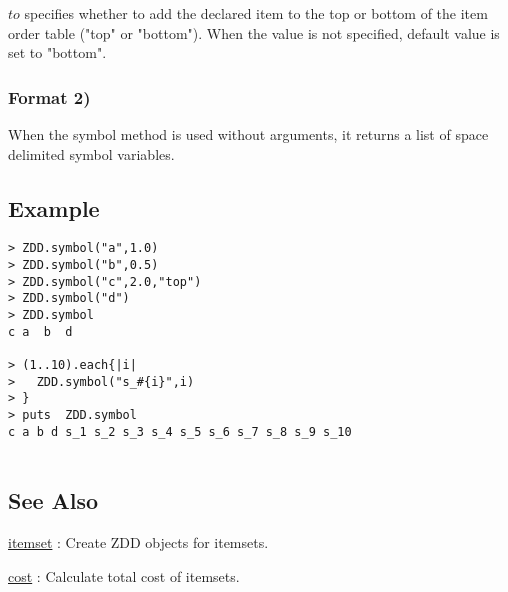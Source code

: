 $to$ specifies whether to add the declared item to the top or bottom of the item order table ("top" or "bottom").   
 When the value is not specified, default value is set to "bottom".

\subsubsection{Format 2)}

When the symbol method is used without arguments, it returns a list of space delimited symbol variables. 


\subsection*{Example}
\begin{Verbatim}[baselinestretch=0.7,frame=single]
> ZDD.symbol("a",1.0)
> ZDD.symbol("b",0.5)
> ZDD.symbol("c",2.0,"top")
> ZDD.symbol("d")
> ZDD.symbol
c a  b  d

> (1..10).each{|i|
>   ZDD.symbol("s_#{i}",i)
> }
> puts  ZDD.symbol
c a b d s_1 s_2 s_3 s_4 s_5 s_6 s_7 s_8 s_9 s_10


\end{Verbatim}

\subsection*{See Also}
\hyperref[sect:itemset]{itemset} : Create ZDD objects for itemsets. 

\hyperref[sect:cost]{cost} : Calculate total cost of itemsets. 

